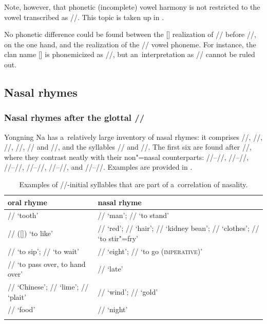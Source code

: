 		Note, however, that phonetic (incomplete) vowel harmony is not restricted to the vowel transcribed
		as //. This topic is taken up in .
		
		No phonetic difference could be found between the [] realization of // before
		//, on the one hand, and the realization of the // vowel phoneme. For instance, the
		clan name [] is phonemicized as //, but an~interpretation as //
		cannot be ruled out. 
		
		\subsection{Nasal rhymes}
		\label{sec:nasalrhymes}
		
		\subsubsection{Nasal rhymes after the glottal //}
		\label{sec:nasalrhymesaftertheglottal}
		
		Yongning Na has a~relatively large inventory of nasal rhymes: it comprises //, //,
		//, //, // and //, and the syllables // and //. The
		first six are found after //, where they contrast neatly with their non"=nasal counterparts:  //--//,  //--//,  //--//,  //--//,  //--//, and  //--//. Examples are provided in .
		
		\begin{table}%
			\caption{Examples of  //-initial syllables that are part of a~correlation of nasality.}
			{\renewcommand{\arraystretch}{1.35}
				\begin{tabularx}{\textwidth}{ Q P{80mm} }
					\lsptoprule
					oral rhyme & nasal rhyme\\ \midrule
					// ‘tooth’  & // ‘man’; // ‘to stand’\\ 
					// ([]) ‘to like’ & // ‘red’; // ‘hair’; // ‘kidney bean’; // ‘clothes’; // ‘to stir"=fry’\\ 
					// ‘to sip’; // ‘to wait’ & // ‘eight’; // ‘to go (\textsc{imperative})’\\ 
					// ‘to pass over, to hand over’ & // ‘late’\\ 
					// ‘Chinese’; // ‘lime’; // ‘plait’  & // ‘wind’; // ‘gold’\\ 
					// ‘food’ & // ‘night’\\
					\lspbottomrule
				\end{tabularx}}
				\label{tab:examplesofinitialsyllablesthatarepartofacorrelationofnasality}
			\end{table}
			
